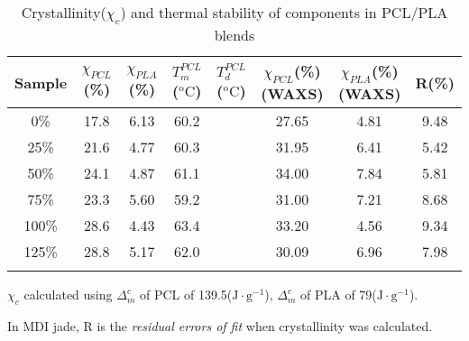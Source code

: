 \documentclass{Head}
\begin{document}
\begin{table}
    \caption{Crystallinity($\chi_c$) and thermal stability of components in PCL/PLA blends}
    \begin{tabular}{cccccccc}
        \toprule
        Sample & $\chi_{PCL}$ (\%) & $\chi_{PLA}$(\%) & $T_m^{PCL}$($\mathrm{^o C}$) & $T_d^{PCL}$($\mathrm{^o C}$) & $\chi_{PCL}$(\%)(WAXS) & $\chi_{PLA}$(\%)(WAXS) & R(\%) \\
        \midrule
        0\%    & 17.8              & 6.13             & 60.2                         &                              & 27.65                  & 4.81                   & 9.48  \\
        25\%   & 21.6              & 4.77             & 60.3                         &                              & 31.95                  & 6.41                   & 5.42  \\
        50\%   & 24.1              & 4.87             & 61.1                         &                              & 34.00                  & 7.84                   & 5.81  \\
        75\%   & 23.3              & 5.60             & 59.2                         &                              & 31.00                  & 7.21                   & 8.68  \\
        100\%  & 28.6              & 4.43             & 63.4                         &                              & 33.20                  & 4.56                   & 9.34  \\
        125\%  & 28.8              & 5.17             & 62.0                         &                              & 30.09                  & 6.96                   & 7.98  \\
        \bottomrule
        \label{DSC_result_table}
    \end{tabular}

    $\chi_c $ calculated using $\Delta_m^c$ of PCL of 139.5($\mathrm{J\cdot g^{-1}}$), $\Delta_m^c$ of PLA of 79($\mathrm{J\cdot g^{-1}}$).\par
    In MDI jade, R is the \textit{residual errors of fit} when crystallinity was calculated.
\end{table}
\end{document}
